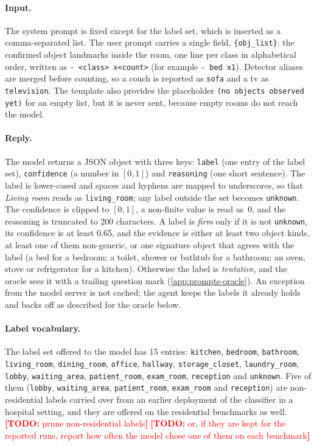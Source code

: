 \documentclass[10pt]{article}
\newcommand{\TODO}[1]{\textcolor{red}{\textbf{[TODO:} #1\textbf{]}}}
\begin{document}
\paragraph{Input.} The system prompt is fixed except for the label set, which is inserted as a comma-separated list. The user prompt carries a single field, \texttt{\{obj\_list\}}: the confirmed object landmarks inside the room, one line per class in alphabetical order, written as \texttt{- <class> x<count>} (for example \texttt{- bed x1}). Detector aliases are merged before counting, so a couch is reported as \texttt{sofa} and a tv as \texttt{television}. The template also provides the placeholder \texttt{(no objects observed yet)} for an empty list, but it is never sent, because empty rooms do not reach the model.

\paragraph{Reply.} The model returns a JSON object with three keys: \texttt{label} (one entry of the label set), \texttt{confidence} (a number in $[0,1]$) and \texttt{reasoning} (one short sentence). The label is lower-cased and spaces and hyphens are mapped to underscores, so that \emph{Living room} reads as \texttt{living\_room}; any label outside the set becomes \texttt{unknown}. The confidence is clipped to $[0,1]$, a non-finite value is read as~0, and the reasoning is truncated to 200 characters. A label is \emph{firm} only if it is not \texttt{unknown}, its confidence is at least 0.65, and the evidence is either at least two object kinds, at least one of them non-generic, or one signature object that agrees with the label (a bed for a bedroom; a toilet, shower or bathtub for a bathroom; an oven, stove or refrigerator for a kitchen). Otherwise the label is \emph{tentative}, and the oracle sees it with a trailing question mark (\cref{app:prompts-oracle}). An exception from the model server is not cached; the agent keeps the labels it already holds and backs off as described for the oracle below.

\paragraph{Label vocabulary.} The label set offered to the model has 15 entries: \texttt{kitchen}, \texttt{bedroom}, \texttt{bathroom}, \texttt{living\_room}, \texttt{dining\_room}, \texttt{office}, \texttt{hallway}, \texttt{storage\_closet}, \texttt{laundry\_room}, \texttt{lobby}, \texttt{waiting\_area}, \texttt{patient\_room}, \texttt{exam\_room}, \texttt{reception} and \texttt{unknown}. Five of them (\texttt{lobby}, \texttt{waiting\_area}, \texttt{patient\_room}, \texttt{exam\_room} and \texttt{reception}) are non-residential labels carried over from an earlier deployment of the classifier in a hospital setting, and they are offered on the residential benchmarks as well. \TODO{prune non-residential labels} \TODO{or, if they are kept for the reported runs, report how often the model chose one of them on each benchmark}
\end{document}
